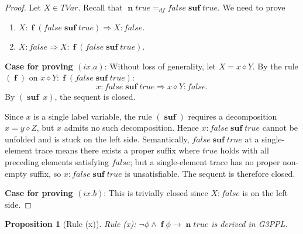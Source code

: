 \documentclass[manuscript,screen]{acmart}
\newtheorem{prop}{Proposition}[section]
\newcommand{\dddef}[0]{=_{df}}
\newcommand{\true}[0]{\mathit{true}}
\newcommand{\false}[0]{\mathit{false}}
\newcommand{\cat}[0]{\diamond}
\newcommand{\GiiiPPLcyc}[0]{\mbox{G3PPL}}
\DeclareMathOperator{\ofst}{\mathbf{f}}
\DeclareMathOperator{\osuf}{\mathbf{suf}}
\newcommand{\TVar}[0]{\textit{TVar}}
\DeclareMathOperator{\nxt}{\mathbf{n}}
\begin{document}
\begin{proof}

Let $X\in \TVar$. 
Recall that $\nxt \true \dddef \false\osuf \true$.
We need to prove
\begin{enumerate}
\item[$(ix.a)$] $X : \ofst(\false\osuf\true)\Rightarrow X : \false$.
\item[$(ix.b)$]  $X : \false\Rightarrow X : \ofst(\false\osuf\true)$.
\end{enumerate}

\textbf{Case for proving $(ix.a)$}: 
Without loss of generality, let $X = x\cat Y$. By the rule $(\ofst)$ on $x\cat Y : \ofst(\false\osuf\true)$:
$$
x : \false\osuf\true\Rightarrow x\cat Y : \false. 
$$
By $(\osuf\ x)$, the sequent is closed. 

\ifx
Since $x$ is a single label variable, the rule $(\osuf)$ requires a decomposition $x = y\cat Z$, but $x$ admits no such decomposition. Hence $x : \false\osuf\true$ cannot be unfolded and is stuck on the left side. Semantically, $\false\osuf\true$ at a single-element trace means there exists a proper suffix where $\true$ holds with all preceding elements satisfying $\false$; but a single-element trace has no proper non-empty suffix, so $x : \false\osuf\true$ is unsatisfiable. The sequent is therefore closed.
\fi

\textbf{Case for proving $(ix.b)$}: 
This is trivially closed since $X : \false$ is on the left side. 

\end{proof}

\begin{prop}[Rule (x)]
Rule (x): 
$\neg\phi\wedge \ofst \phi \rightarrow \nxt \true$
is derived in \GiiiPPLcyc. 
\end{prop}
\end{document}
